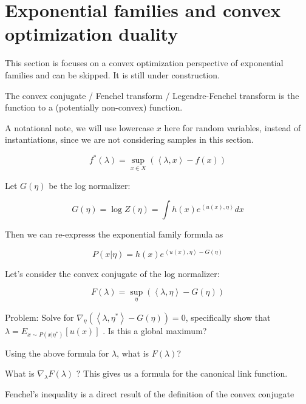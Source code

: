 \documentclass[a4paper]{article}
\begin{document}
\section{Exponential families and convex optimization duality}

This section is focuses on a convex optimization perspective of exponential families and can be skipped.  It is still under construction.

The convex conjugate / Fenchel transform / Legendre-Fenchel transform is the function to a (potentially non-convex) function.

A notational note, we will use lowercase $x$ here for random variables, instead of instantiations, since we are not considering samples in this section.

\begin{equation}
  f^*( \lambda ) = \sup_{x \in X} \left( \left< \lambda, x \right> - f(x) \right)
  \label{convex conjugate}
\end{equation}

Let $G(\eta)$ be the log normalizer:

\begin{equation}
  G(\eta) = \log Z(\eta) = \int h(x) e^{ \left< u(x), \eta \right> } dx
  \label{}
\end{equation}

Then we can re-expresss the exponential family formula as

\begin{equation}
  P( x \vert \eta) = h(x) e^{ \left< u(x), \eta \right> - G(\eta) }
  \label{}
\end{equation}

Let's consider the convex conjugate of the log normalizer:

\begin{equation}
  F( \lambda ) = \sup_\eta \left( \left< \lambda, \eta \right> - G(\eta) \right)
  \label{}
\end{equation}

Problem:  
Solve for $ \nabla_\eta \left( \left< \lambda, \eta^* \right> - G(\eta) \right) = 0 $, specifically show that $ \lambda = E_{ x \sim P( x \vert \eta^*) } \left[ u(x) \right] $ .  Is this a global maximum?  

Using the above formula for $\lambda$, what is $F(\lambda)$?  

What is $\nabla_\lambda F(\lambda)$ ?  This gives us a formula for the canonical link function.

Fenchel's inequality is a direct result of the definition of the convex conjugate
\end{document}
